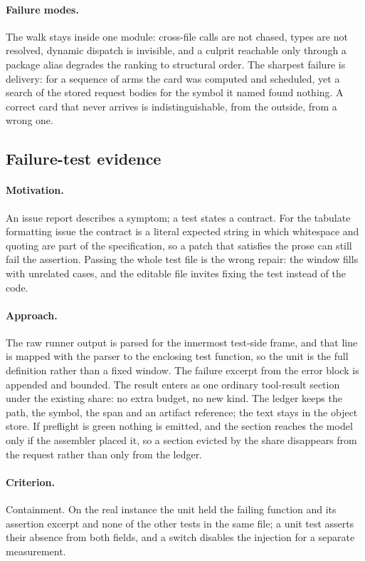 \paragraph{Failure modes.} The walk stays inside one module: cross-file calls
are not chased, types are not resolved, dynamic dispatch is invisible, and a
culprit reachable only through a package alias degrades the ranking to
structural order. The sharpest failure is delivery: for a sequence of arms the
card was computed and scheduled, yet a search of the stored request bodies for
the symbol it named found nothing. A correct card that never
arrives is indistinguishable, from the outside, from a wrong one.

\subsection{Failure-test evidence}

\paragraph{Motivation.} An issue report describes a symptom; a test states a
contract. For the tabulate formatting issue the contract is a literal expected
string in which whitespace and quoting are part of the specification, so a patch
that satisfies the prose can still fail the assertion. Passing the whole test
file is the wrong repair: the window fills with unrelated cases, and the
editable file invites fixing the test instead of the code.

\paragraph{Approach.} The raw runner output is parsed for the innermost
test-side frame, and that line is mapped with the parser to the enclosing test
function, so the unit is the full definition rather than a fixed window. The
failure excerpt from the error block is appended and bounded. The result enters
as one ordinary tool-result section under the existing share: no extra budget,
no new kind. The ledger keeps the path, the
symbol, the span and an artifact reference; the text stays in the object store.
If preflight is green nothing is emitted, and the section reaches the model only
if the assembler placed it, so a section evicted by the share disappears from
the request rather than only from the ledger.

\paragraph{Criterion.} Containment. On the real instance the unit held the
failing function and its assertion excerpt and none of the other tests in the
same file; a unit test asserts their absence from both fields, and a switch
disables the injection for a separate measurement.

